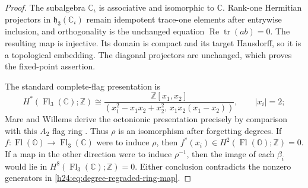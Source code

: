
\begin{proof}
The subalgebra \(\mathbb C_\iota\) is associative and isomorphic to \(\mathbb C\).
Rank-one Hermitian projectors in
\(\mathfrak h_3(\mathbb C_\iota)\) remain idempotent trace-one elements after
entrywise inclusion, and orthogonality is the unchanged equation
\(\operatorname{Re}\operatorname{tr}(ab)=0\).  The resulting map is injective.
Its domain is compact and its target Hausdorff, so it is a topological
embedding.  The diagonal projectors are unchanged, which proves the
fixed-point assertion.

The standard complete-flag presentation is
\[
 H^*(\operatorname{Fl}_3(\mathbb C);\mathbb Z)
 \cong
 \frac{\mathbb Z[x_1,x_2]}
 {(x_1^2-x_1x_2+x_2^2,\,
   x_1x_2(x_1-x_2))},\qquad |x_i|=2;
\]
Mare and Willems derive the octonionic presentation precisely by comparison
with this \(A_2\) flag ring
\cite[Theorem~1.1, p.~484, and the proof on
pp.~496--497]{h24:MareWillems2013}.  Thus \(\rho\) is an isomorphism after
forgetting degrees.  If \(f:\operatorname{Fl}(\mathbb O)\to
\operatorname{Fl}_3(\mathbb C)\) were to induce \(\rho\), then
\(f^*(x_i)\in H^2(\operatorname{Fl}(\mathbb O);\mathbb Z)=0\).  If a map in the other
direction were to induce \(\rho^{-1}\), then the image of each
\(\beta_i\) would lie in
\(H^8(\operatorname{Fl}_3(\mathbb C);\mathbb Z)=0\).  Either conclusion contradicts the
nonzero generators in \eqref{h24:eq:degree-regraded-ring-map}.
\end{proof}

